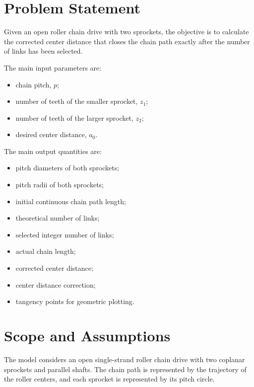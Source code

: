 \documentclass[11pt,a4paper]{article}
\begin{document}
\section{Problem Statement}

Given an open roller chain drive with two sprockets, the objective is to calculate the corrected center distance that closes the chain path exactly after the number of links has been selected.

The main input parameters are:

\begin{itemize}
    \item chain pitch, $p$;
    \item number of teeth of the smaller sprocket, $z_1$;
    \item number of teeth of the larger sprocket, $z_2$;
    \item desired center distance, $a_0$.
\end{itemize}

The main output quantities are:

\begin{itemize}
    \item pitch diameters of both sprockets;
    \item pitch radii of both sprockets;
    \item initial continuous chain path length;
    \item theoretical number of links;
    \item selected integer number of links;
    \item actual chain length;
    \item corrected center distance;
    \item center distance correction;
    \item tangency points for geometric plotting.
\end{itemize}

\section{Scope and Assumptions}

The model considers an open single-strand roller chain drive with two coplanar sprockets and parallel shafts. The chain path is represented by the trajectory of the roller centers, and each sprocket is represented by its pitch circle.
\end{document}
